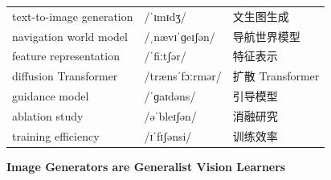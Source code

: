 \documentclass[UTF8,12pt,a4paper]{ctexart}
\providecommand{\zh}[1]{#1}
\begin{document}
\begin{tabular*}{\textwidth}{@{\extracolsep{\fill}}lll@{}}
text-to-image generation & {\ipafont /ˈɪmɪdʒ/} & \zh{文生图生成} \\
navigation world model & {\ipafont /ˌnævɪˈɡeɪʃən/} & \zh{导航世界模型} \\
feature representation & {\ipafont /ˈfiːtʃər/} & \zh{特征表示} \\
diffusion Transformer & {\ipafont /trænsˈfɔːrmər/} & \zh{扩散 Transformer} \\
guidance model & {\ipafont /ˈɡaɪdəns/} & \zh{引导模型} \\
ablation study & {\ipafont /əˈbleɪʃən/} & \zh{消融研究} \\
training efficiency & {\ipafont /ɪˈfɪʃənsi/} & \zh{训练效率} \\
\bottomrule
\end{tabular*}

\newpage

\begin{center}
    {\Large\bfseries Image Generators are Generalist Vision Learners}
\end{center}
\end{document}
